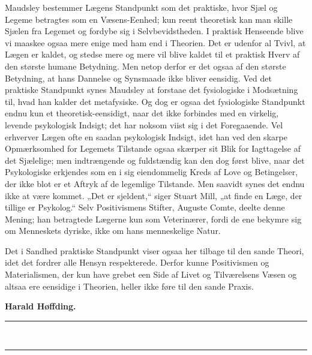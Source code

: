 \documentclass[12pt,a4paper,openany]{book}
\newcommand{\opage}[1]{\marginnote{\footnotesize\textit{[#1]}}}
\begin{document}
Maudsley bestemmer Lægens Standpunkt som det praktiske,
hvor Sjæl og Legeme betragtes som en Væsens-Eenhed;
kun reent theoretisk kan man skille Sjælen fra Legemet og
fordybe sig i Selvbevidstheden. I praktisk Henseende blive
vi maaskee ogsaa mere enige med ham end i Theorien.
Det er udenfor al Tvivl, at Lægen er kaldet, og stedse
mere og mere vil blive kaldet til et praktisk Hverv af den
største humane Betydning. Men netop derfor er det ogsaa
af den største Betydning, at hans Dannelse og Synsmaade
ikke bliver eensidig. Ved det praktiske Standpunkt synes
Maudsley at forstaae det fysiologiske i Modsætning til, hvad
han kalder det metafysiske. Og dog er ogsaa det fysiologiske
Standpunkt endnu kun et theoretisk-eensidigt, naar det ikke
\opage{333}forbindes med en virkelig, levende psykologisk Indsigt; det
har noksom viist sig i det Foregaaende. Vel erhverver
Lægen ofte en saadan psykologisk Indsigt, idet han ved den
skarpe Opmærksomhed for Legemets Tilstande ogsaa skærper
sit Blik for Iagttagelse af det Sjælelige; men indtrængende
og fuldstændig kan den dog først blive, naar det Psykologiske
erkjendes som en i sig eiendommelig Kreds af Love og Betingelser,
der ikke blot er et Aftryk af de legemlige Tilstande.
Men saavidt synes det endnu ikke at være kommet. „Det
er sjeldent,“ siger Stuart Mill, „at finde en Læge, der tillige
er Psykolog.“ Selv Positivismens Stifter, Auguste
Comte, deelte denne Mening; han betragtede Lægerne kun
som Veterinærer, fordi de ene bekymre sig om Menneskets
dyriske, ikke om hans menneskelige Natur.

Det i Sandhed praktiske Standpunkt viser ogsaa her
tilbage til den sande Theori, idet det fordrer alle Hensyn
respekterede. Derfor kunne Positivismen og Materialismen,
der kun have grebet een Side af Livet og Tilværelsens
Væsen og altsaa ere eensidige i Theorien, heller ikke føre til
den sande Praxis.

\begin{flushright}\textbf{Harald Høffding.}\end{flushright}
\begin{center}\rule{2.2cm}{0.4pt}\\[-10pt]\rule{2.2cm}{0.4pt}\end{center}
\end{document}
